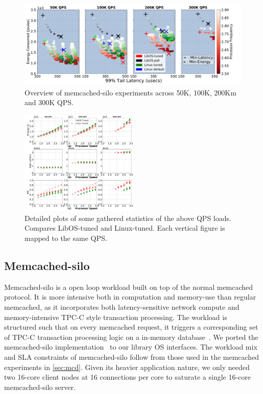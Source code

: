 \begin{figure}
\centering
\includegraphics[width=1\textwidth]{figures/mcdsilo_overview}
\vspace*{-8mm}
\caption[]
{Overview of memcached-silo experiments across 50K, 100K, 200Km and 300K QPS.}
\label{fig:mcdsilo_overview}
\end{figure}

\begin{figure}
\includegraphics[width=0.5\textwidth]{figures/mcdsilo_detail}
\vspace*{-8mm}
\caption[]{Detailed plots of some gathered statistics of the above QPS loads. Compares LibOS-tuned and Linux-tuned. Each vertical figure is mapped to the same QPS.}
\label{fig:mcdsilo_detail}
\end{figure}

\subsection{Memcached-silo}
\label{sec:mcdsilo}
Memcached-silo is a open loop workload built on top of the normal memcached protocol. It is more intensive both in computation and memory-use than regular memcached, as it incorporates both latency-sensitive network compute and memory-intensive TPC-C style transaction processing. The workload is structured such that on every memcached request, it triggers a corresponding set of TPC-C transaction processing logic on a in-memory database~\cite{silo}. We ported the memcached-silo implementation~\cite{mcdsilo, zygos} to our library OS interfaces. The workload mix and SLA constraints of memcached-silo follow from those used in the memcached experiments in \cref{sec:mcd}. Given its heavier application nature, we only needed two 16-core client nodes at 16 connections per core to saturate a single 16-core memcached-silo server. 

